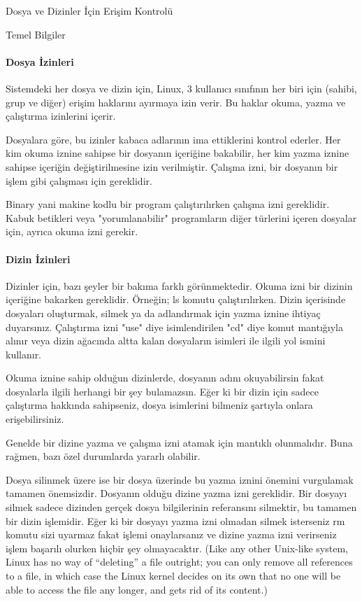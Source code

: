 \begin{section}{Dosya ve Dizinler İçin Erişim Kontrolü}
\begin{subsection}{Temel Bilgiler}
\paragraph{Dosya İzinleri}{Sistemdeki her dosya ve dizin için, Linux, 3 kullanıcı sınıfının her biri için (sahibi, grup ve diğer) erişim haklarını ayırmaya izin verir. Bu haklar okuma, yazma ve çalıştırma izinlerini içerir.}

Dosyalara göre, bu izinler kabaca adlarının ima ettiklerini kontrol ederler. Her kim okuma iznine sahipse bir dosyanın içeriğine bakabilir, her kim yazma iznine sahipse içeriğin değiştirilmesine izin verilmiştir. Çalışma izni, bir dosyanın bir işlem gibi çalışması için gereklidir.

Binary yani makine kodlu bir program çalıştırılırken çalışma izni gereklidir. Kabuk betikleri veya "yorumlanabilir" programların diğer türlerini içeren dosyalar için, ayrıca okuma izni gerekir.

\paragraph{Dizin İzinleri}{Dizinler için, bazı şeyler bir bakıma farklı görünmektedir. Okuma izni bir dizinin içeriğine bakarken gereklidir. Örneğin; ls komutu çalıştırılırken. Dizin içerisinde dosyaları oluşturmak, silmek ya da adlandırmak için yazma iznine ihtiyaç duyarsınız. Çalıştırma izni "use" diye isimlendirilen "cd" diye komut mantığıyla alınır veya dizin ağacında altta kalan dosyaların isimleri ile ilgili yol ismini kullanır.}

Okuma iznine sahip olduğun dizinlerde, dosyanın adını okuyabilirsin fakat dosyalarla ilgili herhangi bir şey bulamazsın. Eğer ki bir dizin için sadece çalıştırma hakkında sahipseniz, dosya isimlerini bilmeniz şartıyla onlara erişebilirsiniz.

Genelde bir dizine yazma ve çalışma izni atamak için mantıklı olunmalıdır. Buna rağmen, bazı özel durumlarda yararlı olabilir.

Dosya silinmek üzere ise bir dosya üzerinde bu yazma iznini önemini vurgulamak tamamen önemsizdir. Dosyanın olduğu dizine yazma izni gereklidir. Bir dosyayı silmek sadece dizinden gerçek dosya bilgilerinin referansını silmektir, bu tamamen bir dizin işlemidir. Eğer ki bir dosyayı yazma izni olmadan silmek isterseniz rm komutu sizi uyarmaz fakat işlemi onaylarsanız ve dizine yazma izni verirseniz işlem başarılı olurken hiçbir şey olmayacaktır. (Like any other Unix-like system, Linux has no way of “deleting” a file outright; you can only remove all references to a file, in which case the Linux kernel decides on its own that no one will be able to access the file any longer, and gets rid of its content.)


\end{subsection}
\end{section}
